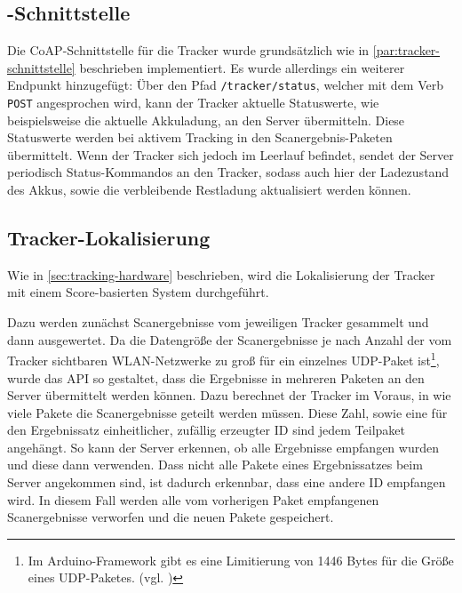 \subsection{-Schnittstelle}

Die \gls{CoAP}-Schnittstelle für die Tracker wurde grundsätzlich wie in
\autoref{par:tracker-schnittstelle} beschrieben implementiert. Es wurde allerdings ein weiterer
Endpunkt hinzugefügt: Über den Pfad \texttt{/tracker/status}, welcher mit dem Verb \texttt{POST}
angesprochen wird, kann der Tracker aktuelle Statuswerte, wie beispielsweise die aktuelle
Akkuladung, an den Server übermitteln. Diese Statuswerte werden bei aktivem Tracking in den
Scanergebnis-Paketen übermittelt. Wenn der Tracker sich jedoch im Leerlauf befindet, sendet der
Server periodisch Status-Kommandos an den Tracker, sodass auch hier der Ladezustand des \gls{Akku}s, sowie
die verbleibende Restladung aktualisiert werden können.

\subsection{Tracker-Lokalisierung} \label{sec:tracker-lokalisierung}

Wie in \autoref{sec:tracking-hardware} beschrieben, wird die Lokalisierung der Tracker mit einem
Score-basierten System durchgeführt.

Dazu werden zunächst Scanergebnisse vom jeweiligen Tracker gesammelt und dann ausgewertet. Da die
Datengröße der Scanergebnisse je nach Anzahl der vom Tracker sichtbaren \gls{WLAN}-Netzwerke zu
groß für ein einzelnes \gls{UDP}-Paket ist\footnote{Im Arduino-Framework gibt es eine
Limitierung von 1446 Bytes für die Größe eines \gls{UDP}-Paketes. (vgl. \cite{Arduino2020})}, wurde
das \gls{API} so gestaltet, dass die Ergebnisse in mehreren Paketen an den Server übermittelt werden
können. Dazu berechnet der Tracker im Voraus, in wie viele Pakete die Scanergebnisse geteilt werden
müssen. Diese Zahl, sowie eine für den Ergebnissatz einheitlicher, zufällig erzeugter \gls{ID} sind
jedem Teilpaket angehängt. So kann der Server erkennen, ob alle Ergebnisse empfangen wurden und
diese dann verwenden. Dass nicht alle Pakete eines Ergebnissatzes beim Server angekommen sind, ist
dadurch erkennbar, dass eine andere \gls{ID} empfangen wird. In diesem Fall werden alle vom
vorherigen Paket empfangenen Scanergebnisse verworfen und die neuen Pakete gespeichert.

